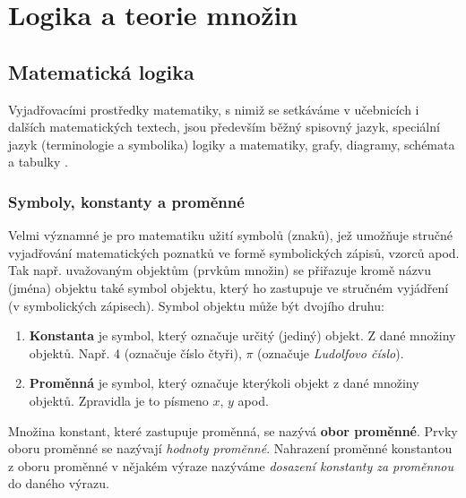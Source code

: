 \chapter{Logika a teorie množin}\label{mai:IchapI}
\minitoc
  \section{Matematická logika}\label{mai:IchapIsecI}
    Vyjadřovacími prostředky matematiky, s nimiž se setkáváme v učebnicích i dalších matematických 
    textech, jsou především běžný spisovný jazyk, speciální jazyk (terminologie a symbolika) logiky 
    a matematiky, grafy, diagramy, schémata a tabulky \cite[s.~13]{polak1991matematika}.
    
    \subsection{Symboly, konstanty a proměnné}
      Velmi významné je pro matematiku užití symbolů (znaků), jež umožňuje stručné vyjadřování 
      matematických poznatků ve formě symbolických zápisů, vzorců apod. Tak např. uvažovaným 
      objektům (prvkům množin) se přiřazuje kromě názvu (jména) objektu také symbol objektu, který 
      ho zastupuje ve stručném vyjádření (v symbolických zápisech). Symbol objektu může být dvojího 
      druhu:
      \begin{enumerate}[label=\alph*)]
        \item \textbf{Konstanta} je symbol, který označuje určitý (jediný) objekt. Z dané množiny 
              objektů. Např. 4 (označuje číslo čtyři), \(\pi\) (označuje \emph{Ludolfovo číslo}). 
        \item \textbf{Proměnná} je symbol, který označuje kterýkoli objekt z dané množiny 
              objektů. Zpravidla je to písmeno \(x\), \(y\) apod.
      \end{enumerate}
      
      Množina konstant, které zastupuje proměnná, se nazývá \textbf{obor proměnné}. Prvky oboru 
      proměnné se nazývají \emph{hodnoty proměnné}. Nahrazení proměnné konstantou z oboru 
      proměnné v nějakém výraze nazýváme \emph{dosazení konstanty za proměnnou} do daného výrazu.
    
